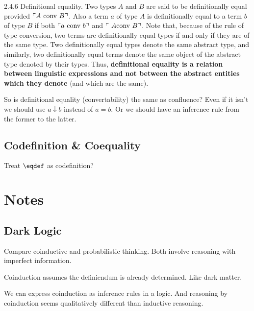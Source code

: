 \documentclass{article}
\begin{document}
\vspace{2ex}

\begin{displayquote} 2.4.6 Definitional equality. Two types \(A\) and \(B\) are
  said to be {\upshape definitionally equal} provided \(\ulcorner
  A\ \text{\upshape conv}\ B\urcorner\). Also a term \(a\) of type
  \(A\) is definitionally equal to a term \(b\) of type \(B\) if both
  \(\ulcorner a\ \text{\upshape conv}\ b\urcorner\) and \(\ulcorner\ A
  \text{\upshape conv}\ B\urcorner\). Note that, because of the rule of type
  conversion, two terms are definitionally equal types if and only if
  they are of the same type. Two definitionally equal types denote the
  same abstract type, and similarly, two definitionally equal terms
  denote the same object of the abstract type denoted by their types.
  Thus, \textbf{definitional equality is a relation between linguistic
    expressions and not between the abstract entities which they
    denote} (and which are the same).
\end{displayquote}

So is definitional equality (convertability) the same as confluence?
Even if it isn't we should use \(a\downarrow b\) instead of \(a = b\).
Or we should have an inference rule from the former to the latter.

\subsection{Codefinition \& Coequality}

Treat \(\defeq\) as codefinition?

\section{Notes}

\subsection{Dark Logic}

Compare coinductive and probabilistic thinking. Both involve reasoning
with imperfect information.



Coinduction assumes the definiendum is already determined. Like dark
matter.

We can express coinduction as inference rules in a logic. And
reasoning by coinduction seems qualitatively different than inductive
reasoning.
\end{document}
